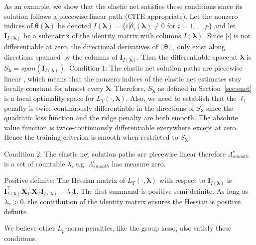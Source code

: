 \documentclass[12pt]{article} %
\theoremstyle{definition}
\begin{document}
As an example, we show that the elastic net satisfies these conditions since its solution follows a piecewise linear path (CITE appropriate).
Let the nonzero indices of $\hat{\boldsymbol{\theta}}(\boldsymbol{\lambda})$ be denoted $I(\boldsymbol\lambda) = \{i | \hat{\theta}_i(\boldsymbol\lambda) \ne 0 \text{ for } i=1,...,p \}$ and let $\boldsymbol I_{I(\boldsymbol \lambda)}$ be a submatrix of the identity matrix with columns $I(\boldsymbol\lambda)$. Since $|\cdot|$ is not differentiable at zero, the directional derivatives of $||\boldsymbol \theta||_1$ only exist along directions spanned by the columns of $\boldsymbol I_{I(\boldsymbol \lambda)}$. Thus the differentiable space at $\boldsymbol \lambda$ is
$
S_{\boldsymbol{\lambda}} = span(\boldsymbol I_{I(\boldsymbol \lambda)})
\label{eq:en_diff_space}
$.
Condition 1: The elastic net solution paths are piecewise linear \citep{zou2003regression}, which means that the nonzero indices of the elastic net estimates stay locally constant for almost every $\boldsymbol{\lambda}$. Therefore, $S_{\boldsymbol{\lambda}}$ as defined in Section~\ref{sec:enet}  is a local optimality space for $L_T(\cdot, \boldsymbol{\lambda})$.
Also, we need to establish that the $\ell_1$ penalty is twice-continuously differentiable in the directions of $S_{\boldsymbol{\lambda}}$ since the quadratic loss function and the ridge penalty are both smooth. The absolute value function is twice-continuously differentiable everywhere except at zero. Hence the training criterion is smooth when restricted to $S_{\boldsymbol{\lambda}}$.

Condition 2: The elastic net solution paths are piecewise linear \citep{zou2003regression} therefore $\Lambda_{smooth}^c$ is a set of countable $\lambda$, e.g. $\Lambda_{smooth}^c$ has measure zero.

Positive definite: The Hessian matrix of $L_T(\cdot, \boldsymbol{\lambda})$ with respect to $\boldsymbol I_{I(\boldsymbol \lambda)}$ is $\boldsymbol I_{I(\boldsymbol \lambda)}^\top \boldsymbol{X}_{T}^\top \boldsymbol{X}_{T} \boldsymbol I_{I(\boldsymbol \lambda)} + \lambda_2 \boldsymbol{I}$. The first summand is positive semi-definite. As long as $\lambda_2 > 0$, the contribution of the identity matrix ensures the Hessian is positive definite.

We believe other $L_p$-norm penalties, like the group lasso, also satisfy these conditions.
\end{document}
